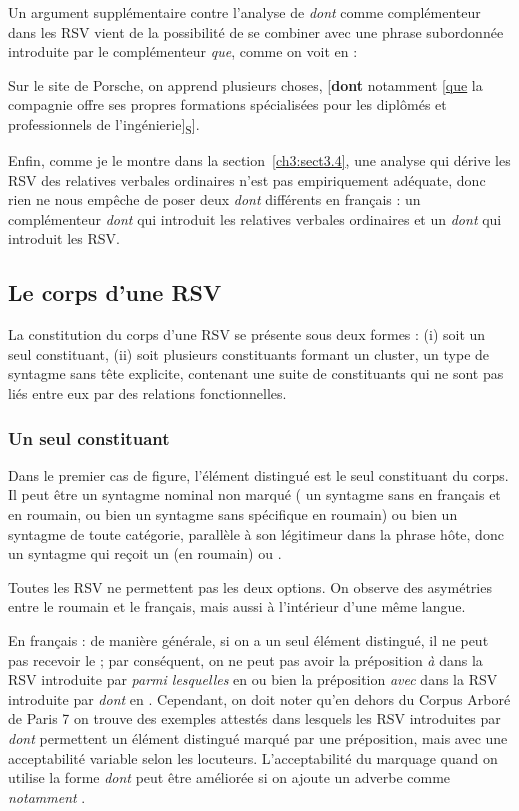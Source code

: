 Un argument supplémentaire contre l’analyse de \textit{dont} comme complémenteur dans les RSV vient de la possibilité de se combiner avec une phrase subordonnée introduite par le complémenteur \textit{que}, comme on voit en  :

\ea \label{ch3:ex23}
Sur le site de Porsche, on apprend plusieurs choses, [\textbf{dont} notamment [\uline{que} la compagnie offre ses propres formations spécialisées pour les diplômés et professionnels de l’ingénierie]\textsubscript{S}].
\z

Enfin, comme je le montre dans la section~\ref{ch3:sect3.4}, une analyse qui dérive les RSV des relatives verbales ordinaires n’est pas empiriquement adéquate, donc rien ne nous empêche de poser deux \textit{dont} différents en français : un complémenteur \textit{dont} qui introduit les relatives verbales ordinaires et un \textit{dont} qui introduit les RSV.


\subsection{Le corps d’une RSV}\label{ch3:sect3.2.2}

La constitution du corps d’une RSV se présente sous deux formes : (i) soit un seul constituant, (ii) soit plusieurs constituants formant un cluster, {\cad} un type de syntagme sans tête explicite, contenant une suite de constituants qui ne sont pas liés entre eux par des relations fonctionnelles.


\subsubsection{Un seul constituant}\label{ch3:sect3.2.2.1}

Dans le premier cas de figure, l’élément distingué est le seul constituant du corps. Il peut être un syntagme nominal non marqué ({\cad} un syntagme sans  en français et en roumain, ou bien un syntagme sans  spécifique en roumain) ou bien un syntagme de toute catégorie, parallèle à son légitimeur dans la phrase hôte, donc un syntagme qui reçoit un  (en roumain) ou .

Toutes les RSV ne permettent pas les deux options. On observe des asymétries entre le roumain et le français, mais aussi à l’intérieur d’une même langue.~

En français : de manière générale, si on a un seul élément distingué, il ne peut pas recevoir le  ; par conséquent, on ne peut pas avoir la préposition \textit{à} dans la RSV introduite par \textit{parmi lesquelles} en  ou bien la préposition \textit{avec} dans la RSV introduite par \textit{dont} en . Cependant, on doit noter qu’en dehors du Corpus Arboré de Paris 7 on trouve des exemples attestés dans lesquels les RSV introduites par \textit{dont} permettent un élément distingué marqué par une préposition, mais avec une acceptabilité variable selon les locuteurs. L’acceptabilité du marquage quand on utilise la forme \textit{dont} peut être améliorée si on ajoute un adverbe comme \textit{notamment} .

